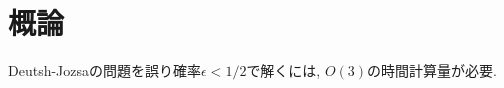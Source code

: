 \chapter{概論}

\begin{ex}
    Deutsh-Jozsaの問題を誤り確率$\epsilon < 1/2$で解くには, $O(3)$の時間計算量が必要.
\end{ex}

\begin{ex}

\end{ex}